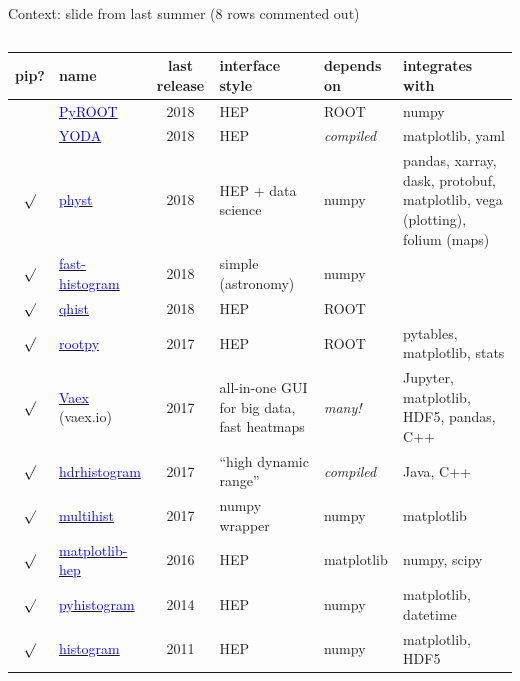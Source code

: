 \documentclass[aspectratio=169]{beamer}
\begin{document}
\begin{frame}{Context: slide from last summer (8 rows commented out)}
\scriptsize
\vspace{0.35 cm}
\begin{columns}
\renewcommand{\arraystretch}{1.2}
\begin{tabular}{c l c p{2.7 cm} p{1.5 cm} p{4.75 cm}}
pip? & name & last release & interface style & depends on & integrates with \\\hline
& \href{https://root.cern.ch/pyroot}{\textcolor{blue}{PyROOT}} & 2018 & HEP & ROOT & numpy \\
& \href{https://yoda.hepforge.org/pydoc}{\textcolor{blue}{YODA}} & 2018 & HEP & {\it compiled} & matplotlib, yaml \\
$\surd$ & \href{https://pypi.python.org/pypi/physt}{\textcolor{blue}{physt}} & 2018 & HEP + data science & numpy & pandas, xarray, dask, protobuf, matplotlib, vega (plotting), folium (maps) \\
$\surd$ & \href{https://pypi.org/project/fast-histogram}{\textcolor{blue}{fast-histogram}} & 2018 & simple (astronomy) & numpy & \\
$\surd$ & \href{https://pypi.org/project/qhist/}{\textcolor{blue}{qhist}} & 2018 & HEP & ROOT & \\
$\surd$ & \href{https://pypi.org/project/rootpy}{\textcolor{blue}{rootpy}} & 2017 & HEP & ROOT & pytables, matplotlib, stats \\
$\surd$ & \href{https://vaex.io}{\textcolor{blue}{Vaex}} (vaex.io) & 2017 & all-in-one GUI for big data, fast heatmaps & {\it many!} & Jupyter, matplotlib, HDF5, pandas, C++ \\
$\surd$ & \href{https://pypi.python.org/pypi/hdrhistogram}{\textcolor{blue}{hdrhistogram}} & 2017 & ``high dynamic range'' & {\it compiled} & Java, C++ \\
$\surd$ & \href{https://pypi.python.org/pypi/multihist}{\textcolor{blue}{multihist}} & 2017 & numpy wrapper & numpy & matplotlib \\
$\surd$ & \href{https://github.com/ibab/matplotlib-hep}{\textcolor{blue}{matplotlib-hep}} & 2016 & HEP & matplotlib & numpy, scipy \\
$\surd$ & \href{https://pypi.python.org/pypi/pyhistogram}{\textcolor{blue}{pyhistogram}} & 2014 & HEP & numpy & matplotlib, datetime \\
$\surd$ & \href{https://pypi.python.org/pypi/histogram}{\textcolor{blue}{histogram}} & 2011 & HEP & numpy & matplotlib, HDF5 \\

\end{tabular}
\end{columns}
\end{frame}
\end{document}
